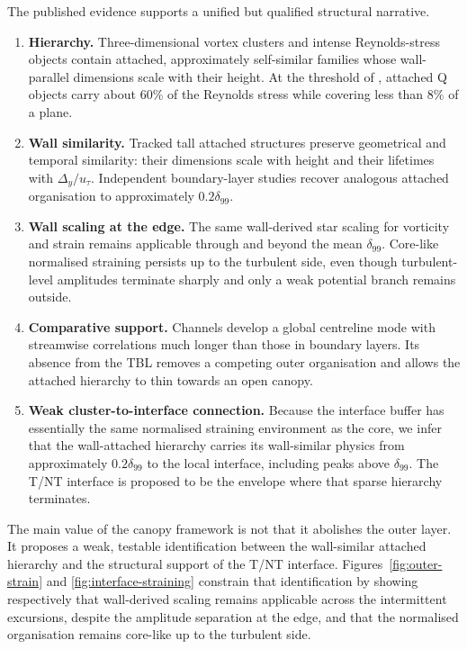 \documentclass[11pt]{article}
\begin{document}
The published evidence supports a unified but qualified structural narrative.
\begin{enumerate}
 \item \textbf{Hierarchy.} Three-dimensional vortex clusters and intense Reynolds-stress objects contain attached, approximately self-similar families whose wall-parallel dimensions scale with their height. At the threshold of \citet{LozanoDuranEtAl2012}, attached Q objects carry about 60\% of the Reynolds stress while covering less than 8\% of a plane.
 \item \textbf{Wall similarity.} Tracked tall attached structures preserve geometrical and temporal similarity: their dimensions scale with height and their lifetimes with $\Delta_y/u_\tau$. Independent boundary-layer studies recover analogous attached organisation to approximately $0.2\delta_{99}$.
 \item \textbf{Wall scaling at the edge.} The same wall-derived star scaling for vorticity and strain remains applicable through and beyond the mean $\delta_{99}$. Core-like normalised straining persists up to the turbulent side, even though turbulent-level amplitudes terminate sharply and only a weak potential branch remains outside.
 \item \textbf{Comparative support.} Channels develop a global centreline mode with streamwise correlations much longer than those in boundary layers. Its absence from the TBL removes a competing outer organisation and allows the attached hierarchy to thin towards an open canopy.
 \item \textbf{Weak cluster-to-interface connection.} Because the interface buffer has essentially the same normalised straining environment as the core, we infer that the wall-attached hierarchy carries its wall-similar physics from approximately $0.2\delta_{99}$ to the local interface, including peaks above $\delta_{99}$. The T/NT interface is proposed to be the envelope where that sparse hierarchy terminates.
\end{enumerate}

The main value of the canopy framework is not that it abolishes the outer layer. It proposes a weak, testable identification between the wall-similar attached hierarchy and the structural support of the T/NT interface. Figures~\ref{fig:outer-strain} and \ref{fig:interface-straining} constrain that identification by showing respectively that wall-derived scaling remains applicable across the intermittent excursions, despite the amplitude separation at the edge, and that the normalised organisation remains core-like up to the turbulent side.
\end{document}
